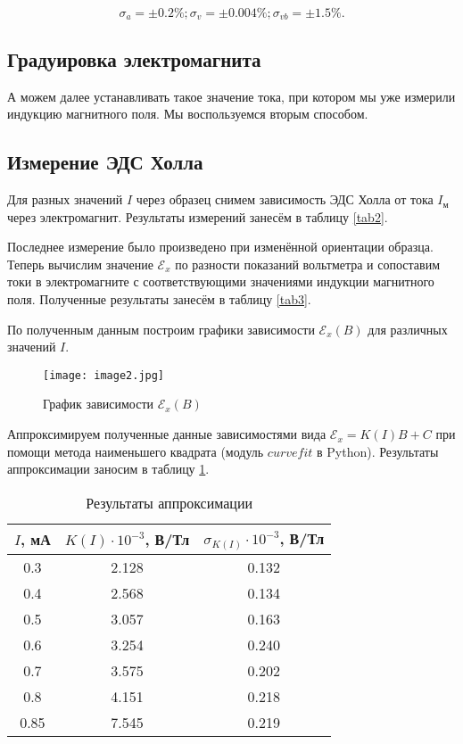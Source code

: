 \documentclass[a4paper,12pt]{article} %
\begin{document}
\[ \sigma_{a} = \pm 0.2 \%; \sigma_{v} = \pm 0.004 \%; \sigma_{vb} = \pm 1.5 \%. \]

\subsection{Градуировка электромагнита}

А можем далее устанавливать такое значение тока, при котором мы уже измерили индукцию магнитного поля. Мы воспользуемся вторым способом.

\subsection{Измерение ЭДС Холла}

Для разных значений $ I $ через образец снимем зависимость ЭДС Холла от тока $ I_\text{м} $ через электромагнит. Результаты измерений занесём в таблицу \ref{tab2}.

Последнее измерение было произведено при изменённой ориентации образца. Теперь вычислим значение $ \mathcal{E}_x $ по разности показаний вольтметра и сопоставим токи в электромагните с соответствующими значениями индукции магнитного поля. Полученные результаты занесём в таблицу \ref{tab3}.

По полученным данным построим графики зависимости $ \mathcal{E}_x(B) $ для различных значений $ I $.

\begin{figure}[h]
    \begin{center}
		\texttt{[image: image2.jpg]}
    \end{center}
	\caption{График зависимости $ \mathcal{E}_x(B) $}
\label{plot2}
\end{figure}

Аппроксимируем полученные данные зависимостями вида $  \mathcal{E}_x=K(I)B + C$ при помощи метода наименьшего квадрата (модуль $curvefit$ в Python). Результаты аппроксимации заносим в таблицу \ref{tab4}.

\begin{table}[h]
	\centering
	\begin{tabular}{|c|c|c|}
		\hline
		$ I $, мА & $ K(I)\cdot10^{-3} $, В/Тл & $ \sigma_{K(I)}\cdot10^{-3} $, В/Тл \\ \hline
		0.3  & 2.128 & 0.132   \\ \hline
		0.4  & 2.568 & 0.134   \\ \hline
		0.5  & 3.057 & 0.163   \\ \hline
		0.6  & 3.254 & 0.240   \\ \hline
		0.7  & 3.575 & 0.202   \\ \hline
		0.8  & 4.151 & 0.218   \\ \hline
		0.85 & 7.545 & 0.219   \\ \hline
	\end{tabular}
	\caption{Результаты аппроксимации}
	\label{tab4}
\end{table}
\end{document}
